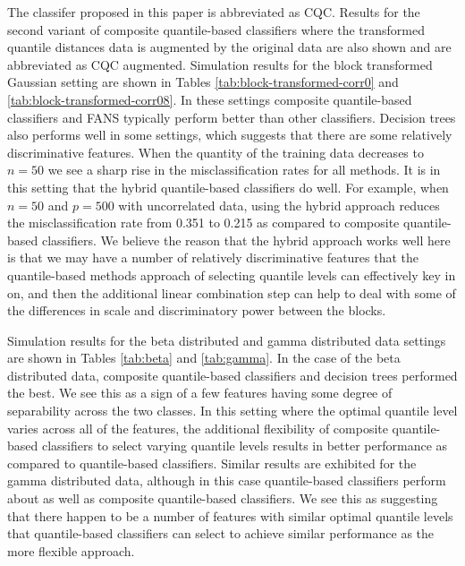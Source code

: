 The classifer proposed in this paper is abbreviated as CQC.  Results for the
second variant of composite quantile-based classifiers where the transformed
quantile distances data is augmented by the original data are also shown and are
abbreviated as CQC augmented.  Simulation results for the block transformed
Gaussian setting are shown in Tables \ref{tab:block-transformed-corr0} and
\ref{tab:block-transformed-corr08}.  In these settings composite quantile-based
classifiers and FANS typically perform better than other classifiers.  Decision
trees also performs well in some settings, which suggests that there are some
relatively discriminative features.  When the quantity of the training data
decreases to $n = 50$ we see a sharp rise in the misclassification rates for all
methods.  It is in this setting that the hybrid quantile-based classifiers do
well.  For example, when $n = 50$ and $p = 500$ with uncorrelated data, using
the hybrid approach reduces the misclassification rate from 0.351 to 0.215 as
compared to composite quantile-based classifiers.  We believe the reason that
the hybrid approach works well here is that we may have a number of relatively
discriminative features that the quantile-based methods approach of selecting
quantile levels can effectively key in on, and then the additional linear
combination step can help to deal with some of the differences in scale and
discriminatory power between the blocks.

Simulation results for the beta distributed and gamma distributed data settings
are shown in Tables \ref{tab:beta} and \ref{tab:gamma}.  In the case of the beta
distributed data, composite quantile-based classifiers and decision trees
performed the best.  We see this as a sign of a few features having some degree
of separability across the two classes.  In this setting where the optimal
quantile level varies across all of the features, the additional flexibility of
composite quantile-based classifiers to select varying quantile levels results
in better performance as compared to quantile-based classifiers.  Similar
results are exhibited for the gamma distributed data, although in this case
quantile-based classifiers perform about as well as composite quantile-based
classifiers.  We see this as suggesting that there happen to be a number of
features with similar optimal quantile levels that quantile-based classifiers
can select to achieve similar performance as the more flexible approach.






